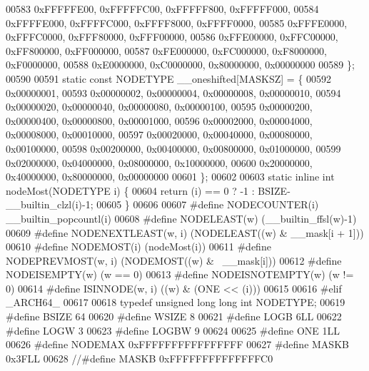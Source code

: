 \begin{DoxyCode}
00583         0xFFFFFE00, 0xFFFFFC00, 0xFFFFF800, 0xFFFFF000,
00584         0xFFFFE000, 0xFFFFC000, 0xFFFF8000, 0xFFFF0000,
00585         0xFFFE0000, 0xFFFC0000, 0xFFF80000, 0xFFF00000,
00586         0xFFE00000, 0xFFC00000, 0xFF800000, 0xFF000000,
00587         0xFE000000, 0xFC000000, 0xF8000000, 0xF0000000,
00588         0xE0000000, 0xC0000000, 0x80000000, 0x00000000
00589 \};
00590 
00591 \textcolor{keyword}{static} \textcolor{keyword}{const} NODETYPE \_\_oneshifted[MASKSZ] = \{
00592         0x00000001,
00593         0x00000002, 0x00000004, 0x00000008, 0x00000010,
00594         0x00000020, 0x00000040, 0x00000080, 0x00000100,
00595         0x00000200, 0x00000400, 0x00000800, 0x00001000,
00596         0x00002000, 0x00004000, 0x00008000, 0x00010000,
00597         0x00020000, 0x00040000, 0x00080000, 0x00100000,
00598         0x00200000, 0x00400000, 0x00800000, 0x01000000,
00599         0x02000000, 0x04000000, 0x08000000, 0x10000000,
00600         0x20000000, 0x40000000, 0x80000000, 0x00000000
00601 \};
00602 
00603 \textcolor{keyword}{static} \textcolor{keyword}{inline} \textcolor{keywordtype}{int} nodeMost(NODETYPE i) \{
00604         \textcolor{keywordflow}{return} (i) == 0 ? -1 : BSIZE-\_\_builtin\_clzl(i)-1;
00605 \}
00606 
00607 \textcolor{preprocessor}{#define NODECOUNTER(i) \_\_builtin\_popcountl(i)}
00608 \textcolor{preprocessor}{#define NODELEAST(w) (\_\_builtin\_ffsl(w)-1)}
00609 \textcolor{preprocessor}{#define NODENEXTLEAST(w, i) (NODELEAST((w) & \_\_mask[i + 1]))}
00610 \textcolor{preprocessor}{#define NODEMOST(i) (nodeMost(i))}
00611 \textcolor{preprocessor}{#define NODEPREVMOST(w, i) (NODEMOST((w) & ~\_\_mask[i]))}
00612 \textcolor{preprocessor}{#define NODEISEMPTY(w) (w == 0)}
00613 \textcolor{preprocessor}{#define NODEISNOTEMPTY(w) (w != 0)}
00614 \textcolor{preprocessor}{#define ISINNODE(w, i) ((w) & (ONE << (i)))                                                     }
00615 \textcolor{preprocessor}{}
00616 \textcolor{preprocessor}{#elif \_ARCH64\_}
00617 
00618 \textcolor{keyword}{typedef} \textcolor{keywordtype}{unsigned} \textcolor{keywordtype}{long} \textcolor{keywordtype}{long} \textcolor{keywordtype}{int} NODETYPE; 
00619 \textcolor{preprocessor}{#define BSIZE 64}
00620 \textcolor{preprocessor}{#define WSIZE 8}
00621 \textcolor{preprocessor}{#define LOGB 6LL}
00622 \textcolor{preprocessor}{#define LOGW 3}
00623 \textcolor{preprocessor}{#define LOGBW 9}
00624 
00625 \textcolor{preprocessor}{#define ONE 1LL}
00626 \textcolor{preprocessor}{#define NODEMAX 0xFFFFFFFFFFFFFFFF}
00627 \textcolor{preprocessor}{#define MASKB 0x3FLL}
00628 \textcolor{comment}{//#define MASKB 0xFFFFFFFFFFFFFFC0}

\end{DoxyCode}
